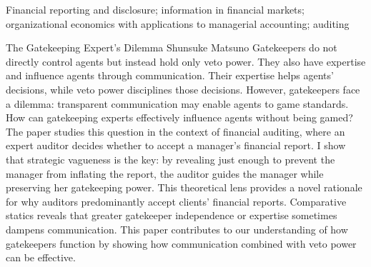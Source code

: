 \newcommand{\co}{\textsuperscript{†}}




\begin{cventries}

\cventryLONG
	{Financial reporting and disclosure; information in financial markets; organizational economics with applications to managerial accounting; auditing}  

\end{cventries}

\vspace{.3cm}


\paperentry
	{The Gatekeeping Expert's Dilemma}   %
	{Shunsuke Matsuno}   %
	{}   %
	{}  %
	{}   %
	{}   %
	{}   %
	{%
	Gatekeepers do not directly control agents but instead hold only veto power. They also have expertise and influence agents through communication. Their expertise helps agents' decisions, while veto power disciplines those decisions. However, gatekeepers face a dilemma: transparent communication may enable agents to game standards. How can gatekeeping experts effectively influence agents without being gamed? The paper studies this question in the context of financial auditing, where an expert auditor decides whether to accept a manager's financial report. I show that strategic vagueness is the key: by revealing just enough to prevent the manager from inflating the report, the auditor guides the manager while preserving her gatekeeping power. This theoretical lens provides a novel rationale for why auditors predominantly accept clients' financial reports. Comparative statics reveals that greater gatekeeper independence or expertise sometimes dampens communication. This paper contributes to our understanding of how gatekeepers function by showing how communication combined with veto power can be effective.
	}

